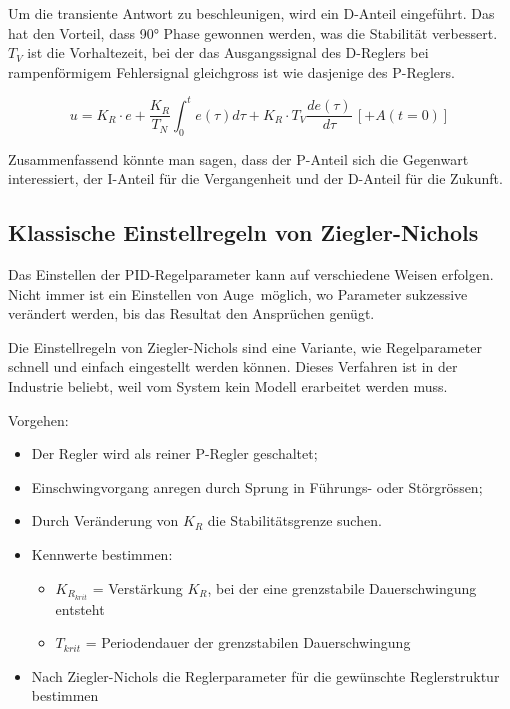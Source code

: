 \documentclass[a4paper,10pt,oneside]{article}
\begin{document}
Um die transiente Antwort zu beschleunigen, wird ein D-Anteil eingeführt. Das hat den Vorteil, dass 90° Phase gewonnen werden, was die Stabilität verbessert. $T_V$ ist die Vorhaltezeit, bei der das Ausgangssignal des D-Reglers bei rampenförmigem Fehlersignal gleichgross ist wie dasjenige des P-Reglers.

\begin{equation}
u= K_R \cdot e + \frac{K_R}{T_N} \int_{0}^{t} e(\tau)d\tau + K_R \cdot T_V \frac{de(\tau)}{d\tau} \, \left[+ A(t=0)\right]
\end{equation}

Zusammenfassend könnte man sagen, dass der P-Anteil sich die Gegenwart interessiert, der I-Anteil für die Vergangenheit und der D-Anteil für die Zukunft.



\subsection{Klassische Einstellregeln von Ziegler-Nichols}\label{ZN}

Das Einstellen der PID-Regelparameter kann auf verschiedene Weisen erfolgen. Nicht immer ist ein Einstellen \glqq von Auge\grqq \, möglich, wo Parameter sukzessive verändert werden, bis das Resultat den Ansprüchen genügt. 

Die Einstellregeln von Ziegler-Nichols sind eine Variante, wie Regelparameter schnell und einfach eingestellt werden können. Dieses Verfahren ist in der Industrie beliebt, weil vom System kein Modell erarbeitet werden muss.

Vorgehen:
\begin{itemize}
\item Der Regler wird als reiner P-Regler geschaltet;
\item Einschwingvorgang anregen durch Sprung in Führungs- oder Störgrössen;
\item Durch Veränderung von $K_R$ die Stabilitätsgrenze suchen.
\item Kennwerte bestimmen:
\begin{itemize}
\item $K_{R_{krit}}$ = Verstärkung $K_R$, bei der eine grenzstabile Dauerschwingung entsteht
\item $T_{krit}$ = Periodendauer der grenzstabilen Dauerschwingung
\end{itemize}
\item Nach Ziegler-Nichols die Reglerparameter für die gewünschte Reglerstruktur bestimmen
\end{itemize}
\end{document}

